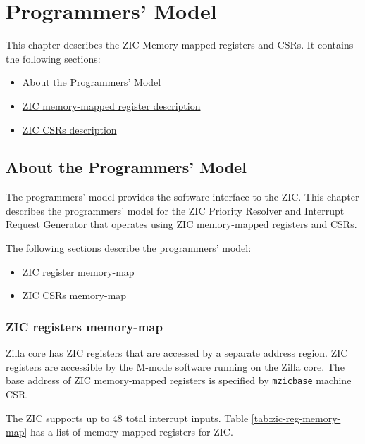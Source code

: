 \chapter{Programmers' Model}
This chapter describes the ZIC Memory-mapped registers and CSRs. It contains the following sections:
\begin{itemize}
    \item \hyperref[sec:about-programmers-model]{About the Programmers' Model}
    \item \hyperref[sec:zic-mem-map-register-description]{ZIC memory-mapped register description}
    \item \hyperref[sec:zic-csr-description]{ZIC CSRs description}
\end{itemize}
\newpage

\section{About the Programmers' Model}
\label{sec:about-programmers-model}
The programmers’ model provides the software interface to the ZIC. This chapter describes the programmers’ model for the ZIC Priority Resolver and Interrupt Request Generator that operates using ZIC memory-mapped registers and CSRs.

The following sections describe the programmers’ model:
\begin{itemize}
    \item \hyperref[subsec:zic-register-mem-map]{ZIC register memory-map}
    \item \hyperref[subsec:zic-csrs-mem-map]{ZIC CSRs memory-map}
\end{itemize}

\subsection{ZIC registers memory-map}
\label{subsec:zic-register-mem-map}
Zilla core has ZIC registers that are accessed by a separate address region. ZIC registers are accessible by the M-mode software running on the Zilla core. The base address of ZIC memory-mapped registers is specified by \texttt{mzicbase} machine CSR.

The ZIC supports up to 48 total interrupt inputs. Table \ref{tab:zic-reg-memory-map} has a list of memory-mapped registers for ZIC.

